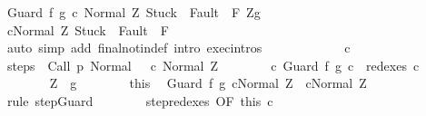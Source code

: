 \begin{isabellebody}
\ {\isachardoublequoteopen}{\isasymGamma}{\isasymturnstile}{\isasymlangle}Guard\ f\ g\ c\ {\isacharcomma}Normal\ Z{\isasymrangle}\ {\isasymRightarrow}{\isasymnotin}{\isacharparenleft}{\isacharbraceleft}Stuck{\isacharbraceright}\ {\isasymunion}\ Fault\ {\isacharbackquote}\ {\isacharparenleft}{\isacharminus}F{\isacharparenright}{\isacharparenright}{\isachardoublequoteclose}\ {\isachardoublequoteopen}Z{\isasymin}g{\isachardoublequoteclose}\isanewline
\ \ \ \ \ \ \isamarkupfalse%
\ {\isachardoublequoteopen}{\isasymGamma}{\isasymturnstile}{\isasymlangle}c{\isacharcomma}Normal\ Z{\isasymrangle}\ {\isasymRightarrow}{\isasymnotin}{\isacharparenleft}{\isacharbraceleft}Stuck{\isacharbraceright}\ {\isasymunion}\ Fault\ {\isacharbackquote}\ {\isacharparenleft}{\isacharminus}F{\isacharparenright}{\isacharparenright}{\isachardoublequoteclose}\isanewline
\ \ \ \ \ \ \ \ \isamarkupfalse%
\ {\isacharparenleft}auto\ simp\ add{\isacharcolon}\ final{\isacharunderscore}notin{\isacharunderscore}def\ intro{\isacharcolon}\ exec{\isachardot}intros{\isacharparenright}\isanewline
\ \ \ \ \isamarkupfalse%
\isanewline
\ \ \ \ \ \ \isamarkupfalse%
\ c{\isacharprime}\isanewline
\ \ \ \ \ \ \isamarkupfalse%
\ steps{\isacharcolon}\ {\isachardoublequoteopen}{\isasymGamma}{\isasymturnstile}\ {\isacharparenleft}Call\ p{\isacharcomma}\ Normal\ {\isasymsigma}{\isacharparenright}\ {\isasymrightarrow}\isactrlsup {\isacharplus}\ {\isacharparenleft}c{\isacharprime}{\isacharcomma}\ Normal\ Z{\isacharparenright}{\isachardoublequoteclose}\isanewline
\ \ \ \ \ \ \isamarkupfalse%
\ c{\isacharprime}{\isacharcolon}\ {\isachardoublequoteopen}Guard\ f\ g\ c\ {\isasymin}\ redexes\ c{\isacharprime}{\isachardoublequoteclose}\isanewline
\ \ \ \ \ \ \isamarkupfalse%
\ {\isachardoublequoteopen}Z\ {\isasymin}\ g{\isachardoublequoteclose}\isanewline
\ \ \ \ \ \ \isamarkupfalse%
\ this\ \isamarkupfalse%
\ {\isachardoublequoteopen}{\isasymGamma}{\isasymturnstile}{\isacharparenleft}Guard\ f\ g\ c{\isacharcomma}Normal\ Z{\isacharparenright}\ {\isasymrightarrow}\ {\isacharparenleft}c{\isacharcomma}Normal\ Z{\isacharparenright}{\isachardoublequoteclose}\isanewline
\ \ \ \ \ \ \ \ \isamarkupfalse%
\ {\isacharparenleft}rule\ step{\isachardot}Guard{\isacharparenright}\isanewline
\ \ \ \ \ \ \isamarkupfalse%
\ step{\isacharunderscore}redexes\ {\isacharbrackleft}OF\ this\ c{\isacharprime}{\isacharbrackright}\ \isamarkupfalse%

\end{isabellebody}
